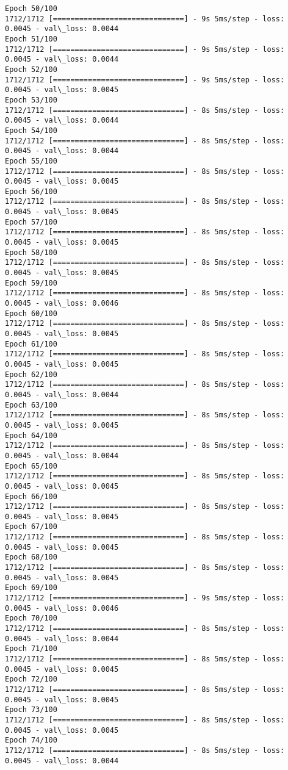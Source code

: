 \documentclass[11pt]{article}
\begin{document}
\begin{Verbatim}[commandchars=\\\{\}]
Epoch 50/100
1712/1712 [==============================] - 9s 5ms/step - loss: 0.0045 - val\_loss: 0.0044
Epoch 51/100
1712/1712 [==============================] - 9s 5ms/step - loss: 0.0045 - val\_loss: 0.0044
Epoch 52/100
1712/1712 [==============================] - 9s 5ms/step - loss: 0.0045 - val\_loss: 0.0045
Epoch 53/100
1712/1712 [==============================] - 8s 5ms/step - loss: 0.0045 - val\_loss: 0.0044
Epoch 54/100
1712/1712 [==============================] - 8s 5ms/step - loss: 0.0045 - val\_loss: 0.0044
Epoch 55/100
1712/1712 [==============================] - 8s 5ms/step - loss: 0.0045 - val\_loss: 0.0045
Epoch 56/100
1712/1712 [==============================] - 8s 5ms/step - loss: 0.0045 - val\_loss: 0.0045
Epoch 57/100
1712/1712 [==============================] - 8s 5ms/step - loss: 0.0045 - val\_loss: 0.0045
Epoch 58/100
1712/1712 [==============================] - 8s 5ms/step - loss: 0.0045 - val\_loss: 0.0045
Epoch 59/100
1712/1712 [==============================] - 8s 5ms/step - loss: 0.0045 - val\_loss: 0.0046
Epoch 60/100
1712/1712 [==============================] - 8s 5ms/step - loss: 0.0045 - val\_loss: 0.0045
Epoch 61/100
1712/1712 [==============================] - 8s 5ms/step - loss: 0.0045 - val\_loss: 0.0045
Epoch 62/100
1712/1712 [==============================] - 8s 5ms/step - loss: 0.0045 - val\_loss: 0.0044
Epoch 63/100
1712/1712 [==============================] - 8s 5ms/step - loss: 0.0045 - val\_loss: 0.0045
Epoch 64/100
1712/1712 [==============================] - 8s 5ms/step - loss: 0.0045 - val\_loss: 0.0044
Epoch 65/100
1712/1712 [==============================] - 8s 5ms/step - loss: 0.0045 - val\_loss: 0.0045
Epoch 66/100
1712/1712 [==============================] - 8s 5ms/step - loss: 0.0045 - val\_loss: 0.0045
Epoch 67/100
1712/1712 [==============================] - 8s 5ms/step - loss: 0.0045 - val\_loss: 0.0045
Epoch 68/100
1712/1712 [==============================] - 8s 5ms/step - loss: 0.0045 - val\_loss: 0.0045
Epoch 69/100
1712/1712 [==============================] - 9s 5ms/step - loss: 0.0045 - val\_loss: 0.0046
Epoch 70/100
1712/1712 [==============================] - 8s 5ms/step - loss: 0.0045 - val\_loss: 0.0044
Epoch 71/100
1712/1712 [==============================] - 8s 5ms/step - loss: 0.0045 - val\_loss: 0.0045
Epoch 72/100
1712/1712 [==============================] - 8s 5ms/step - loss: 0.0045 - val\_loss: 0.0045
Epoch 73/100
1712/1712 [==============================] - 8s 5ms/step - loss: 0.0045 - val\_loss: 0.0045
Epoch 74/100
1712/1712 [==============================] - 8s 5ms/step - loss: 0.0045 - val\_loss: 0.0044

\end{Verbatim}
\end{document}

